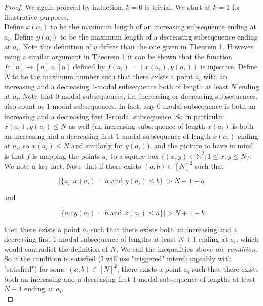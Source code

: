 \documentclass{article}
\begin{document}
\begin{proof}
We again proceed by induction. $k = 0$ is trivial. We start at $k = 1$ for illustrative purposes. \\

Define $x(a_i)$ to be the maximum length of an increasing subsequence ending at $a_i$. Define $y(a_i)$ to be the maximum length of a decreasing subseqeuence ending at $a_i$. Note this definition of $y$ differs than the one given in Theorem 1. However, using a similar argument in Theorem 1 it can be shown that the function $f : [n] \rightarrow [n] \times [n]$ defined by $f(a_i) = (x(a_i), y(a_i))$ is injective. Define $N$ to be the maximum number such that there exists a point $a_i$ with an increasing and a decreasing $1$-modal subsequence both of length at least $N$ ending at $a_i$. Note that $0$-modal subsequences, i.e. increasing or decreasing subsequences, also count as $1$-modal subsequences. In fact, any $0$-modal subsequence is both an increasing and a decreasing first $1$-modal subsequence. So in particular $x(a_i), y(a_i) \leq N$ as well (an increasing subsequence of length $x(a_i)$ is both an increasing and a decreasing first $1$-modal subsequence of length $x(a_i)$ ending at $a_i$, so $x(a_i) \leq N$ and similarly for $y(a_i)$), and the picture to have in mind is that $f$ is mapping the points $a_i$ to a square box $\{(x,y) \in \mathbb{N}^2 : 1 \leq x, y \leq N \}$. \\

We note a key fact. Note that if there exists $(a,b) \in [N]^2$ such that 

$$|\{a_i : x(a_i) = a \text{ and } y(a_i) \leq b\}| > N+1-a$$

and 

$$|\{a_i : y(a_i) = b \text{ and } x(a_i) \leq a\}| > N+1-b$$

then there exists a point $a_i$ such that there exists both an increasing and a decreasing first $1$-modal subsequence of lengths at least $N+1$ ending at $a_i$, which would contradict the definition of $N$. We call the inequalities above \emph{the condition}. So if the condition is satisfied (I will use "triggered" interchangeably with "satisfied") for some $(a,b) \in [N]^2$, there exists a point $a_i$ such that there exists both an increasing and a decreasing first $1$-modal subsequence of lengths at least $N+1$ ending at $a_i$. \\


\end{proof}
\end{document}
